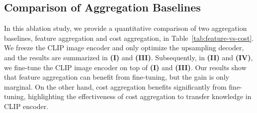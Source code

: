 \documentclass[10pt,twocolumn,letterpaper]{article}
\begin{document}
\subsection{Comparison of Aggregation Baselines}\vspace{-10pt}
\begin{table}[H]
    \centering
    \vspace{-5pt}
    \caption{\textbf{Quantitative comparison between feature and cost aggregation.} Cost aggregation acts as an effective alternative to direct fine-tuning of CLIP image encoder. \textit{F.T.: Fine-Tuning.}
    }
    \label{tab:feature-vs-cost}
    \vspace{-10pt}

\end{table}
 In this ablation study, we provide a quantitative comparison of two aggregation baselines, feature aggregation and cost aggregation, in Table~\ref{tab:feature-vs-cost}. We freeze the CLIP image encoder and only optimize the upsampling decoder, and the results are summarized in \textbf{(I)} and \textbf{(III)}. Subsequently, in \textbf{(II)} and \textbf{(IV)}, we fine-tune the CLIP image encoder on top of \textbf{(I)} and \textbf{(III)}. Our results show that feature aggregation  can benefit from fine-tuning, but the gain is only marginal. On the other hand, cost aggregation benefits significantly from fine-tuning, highlighting the effectiveness of cost aggregation to transfer knowledge in CLIP encoder. 
\end{document}
